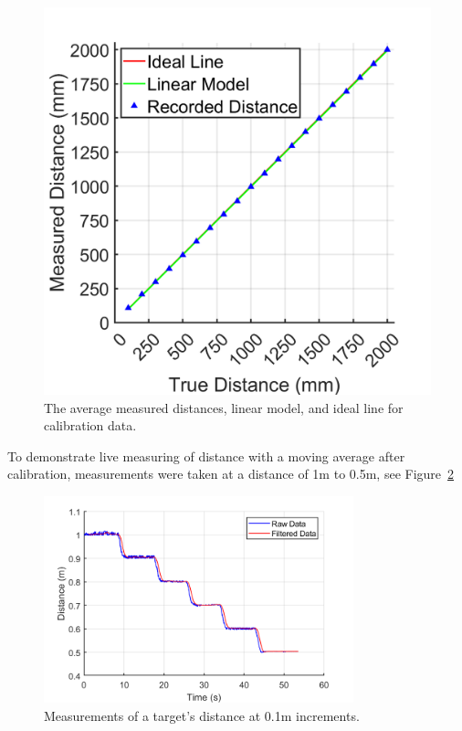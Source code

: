 \documentclass[a4paper,12pt]{article}
\begin{document}
\begin{figure}[htbp]
\begin{minipage}{0.45\textwidth}
        \includegraphics[width=\linewidth]{figs/calibration.png}
        \caption{The average measured distances, linear model, and ideal line for calibration data.}
        \label{fig:calibration}
    \end{minipage}
\end{figure}



To demonstrate live measuring of distance with a moving average after calibration, measurements were taken at a distance of 1m to 0.5m, see Figure~\ref{fig:liveData}

\begin{figure}[htbp]
    \centering
    \includegraphics[width=0.8\textwidth]{figs/liveData.png}
    \caption{Measurements of a target's distance at 0.1m increments.}
    \label{fig:liveData}
\end{figure}
\end{document}
